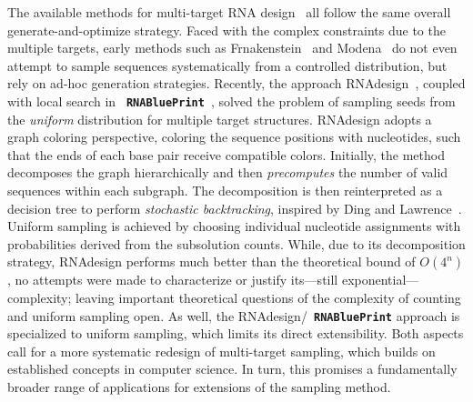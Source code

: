 \documentclass[]{bmcart}
\newcommand{\Def}[1]{\emph{#1}}
\newcommand{\parHead}[1]{\Final{\paragraph{#1}}}
\newcommand{\Final}[1]{\begingroup\color{red!70!black}#1\endgroup}
\renewcommand{\Final}[1]{}
\newcommand{\Nuc}[1]{{\sf #1}}
\newcommand{\Cb}{\Nuc{C}}
\newcommand{\Gb}{\Nuc{G}}
\newcommand{\GCb}{\Gb\Cb}
\newcommand{\Software}[1]{{\ttfamily #1}}
\newcommand{\RNAblueprint}{{\tt \bfseries{}\color{black!85} RNA\textcolor{blue!70!black}{Blue}Print}}
\newcommand{\citep}[1]{\cite{#1}}
\newcommand{\revised}[1]{{\color{red} #1}}
\begin{document}
\parHead{Specificities and similarities of multi-target design.}
The available methods for multi-target RNA design~\citep{Lyngsoe2012,HoenerzuSiederdissen2013,Taneda2015,Hammer2017} all follow the same overall generate-and-optimize strategy.
%
Faced with the complex constraints due to the multiple targets, early methods such as \Software{Frnakenstein}~\citep{Lyngsoe2012} and \Software{Modena}~\citep{Taneda2015} \revised{do not even attempt to sample sequences systematically from a controlled distribution}, but rely on ad-hoc generation strategies.
%
Recently, the approach \Software{RNAdesign}~\citep{HoenerzuSiederdissen2013}, coupled with local
search in \RNAblueprint{}~\citep{Hammer2017}, solved the
problem of sampling seeds from the \emph{uniform} distribution for multiple
target structures. \Software{RNAdesign} adopts a graph coloring perspective,
coloring the sequence positions with nucleotides, such that the ends of each base pair receive compatible colors. Initially, the method decomposes the graph hierarchically and then \Def{precomputes} the number of valid sequences
within each subgraph. The decomposition is then reinterpreted as a
decision tree to perform \Def{stochastic backtracking}, inspired by
Ding and Lawrence~\citep{Ding2003}. Uniform sampling is achieved by
choosing individual nucleotide assignments with probabilities derived
from the subsolution counts. While, due to its decomposition strategy, 
\Software{RNAdesign} performs much better than the theoretical bound of $O(4^n)$, no attempts were made to characterize or justify its---still exponential---complexity; leaving important theoretical questions of the complexity of counting and uniform sampling open.
As well, the \Software{RNAdesign}/\RNAblueprint{} approach is specialized to uniform sampling, which limits its direct extensibility. Both aspects call for a more systematic redesign of multi-target sampling, which builds on established concepts in computer science. In turn, this promises a fundamentally broader range of applications for extensions of the sampling method.

%
 
\end{document}
